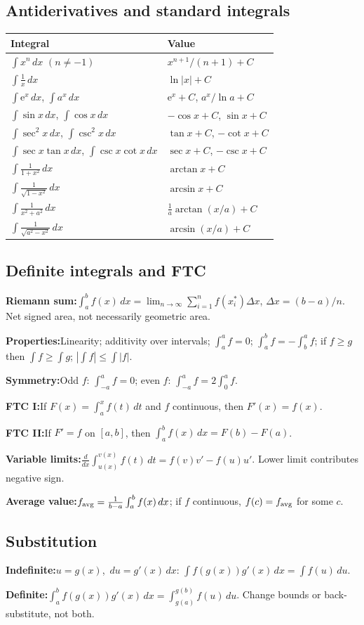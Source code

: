 \documentclass[10pt]{article}
\newcommand{\e}{\mathrm e}
\newcommand{\dx}{\,dx}
\newcommand{\dt}{\,dt}
\newcommand{\du}{\,du}
\newenvironment{cheatitems}{\par\vspace{-2pt}}{\par\vspace{-2pt}}
\newcommand{\cheatrow}[2]{%
  \par\noindent\textbf{#1:}\nobreak\hspace{0.25em}#2\par
}
\begin{document}
\begin{multicols}{3}
\subsection*{Antiderivatives and standard integrals}
\begin{tabular}{@{}L{0.42\columnwidth}L{0.50\columnwidth}@{}}
\toprule
\textbf{Integral} & \textbf{Value}\tabularnewline
\midrule
$\int x^n\dx$ $(n\ne-1)$ & $x^{n+1}/(n+1)+C$\tabularnewline
$\int \frac1x\dx$ & $\ln|x|+C$\tabularnewline
$\int \e^x\dx$, $\int a^x\dx$ & $\e^x+C$, $a^x/\ln a+C$\tabularnewline
$\int\sin x\dx$, $\int\cos x\dx$ & $-\cos x+C$, $\sin x+C$\tabularnewline
$\int\sec^2x\dx$, $\int\csc^2x\dx$ & $\tan x+C$, $-\cot x+C$\tabularnewline
$\int\sec x\tan x\dx$, $\int\csc x\cot x\dx$ & $\sec x+C$, $-\csc x+C$\tabularnewline
$\int\frac{1}{1+x^2}\dx$ & $\arctan x+C$\tabularnewline
$\int\frac{1}{\sqrt{1-x^2}}\dx$ & $\arcsin x+C$\tabularnewline
$\int\frac{1}{x^2+a^2}\dx$ & $\frac1a\arctan(x/a)+C$\tabularnewline
$\int\frac{1}{\sqrt{a^2-x^2}}\dx$ & $\arcsin(x/a)+C$\tabularnewline
\bottomrule
\end{tabular}

\newpage
\subsection*{Definite integrals and FTC}
\begin{cheatitems}
\cheatrow{Riemann sum}{$\displaystyle \int_a^b f(x)\dx=\lim_{n\to\infty}\sum_{i=1}^{n}f(x_i^*)\Delta x$, $\Delta x=(b-a)/n$. Net signed area, not necessarily geometric area.}
\cheatrow{Properties}{Linearity; additivity over intervals; $\int_a^a f=0$; $\int_a^b f=-\int_b^a f$; if $f\ge g$ then $\int f\ge\int g$; $|\int f|\le\int|f|$.}
\cheatrow{Symmetry}{Odd $f$: $\int_{-a}^{a}f=0$; even $f$: $\int_{-a}^{a}f=2\int_0^af$.}
\cheatrow{FTC I}{If $F(x)=\int_a^x f(t)\dt$ and $f$ continuous, then $F'(x)=f(x)$.}
\cheatrow{FTC II}{If $F'=f$ on $[a,b]$, then $\int_a^b f(x)\dx=F(b)-F(a)$.}
\cheatrow{Variable limits}{$\displaystyle\frac{d}{dx}\int_{u(x)}^{v(x)}f(t)\dt=f(v)v'-f(u)u'$. Lower limit contributes negative sign.}
\cheatrow{Average value}{$f_{\rm avg}=\frac{1}{b-a}\int_a^b f(x)\dx$; if $f$ continuous, $f(c)=f_{\rm avg}$ for some $c$.}
\end{cheatitems}

\subsection*{Substitution}
\begin{cheatitems}
\cheatrow{Indefinite}{$u=g(x)$, $\du=g'(x)\dx$: $\int f(g(x))g'(x)\dx=\int f(u)\du$.}
\cheatrow{Definite}{$\displaystyle\int_a^b f(g(x))g'(x)\dx=\int_{g(a)}^{g(b)}f(u)\du$. Change bounds or back-substitute, not both.}


\end{cheatitems}
\end{multicols}
\end{document}
